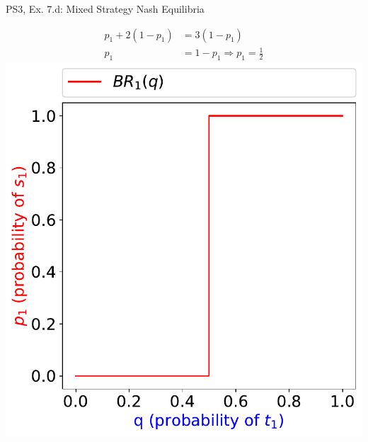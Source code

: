 \begin{frame}{PS3, Ex. 7.d: Mixed Strategy Nash Equilibria}
\begin{multicols}{2}
\begin{align*}
      p_1 + 2(1-p_1)  &= 3(1-p_1) \\
      p_1             &= 1-p_1 \Rightarrow p_1 = \frac{1}{2}
    \end{align*}
  \vfill\null \columnbreak
    \includegraphics[width=\columnwidth]{figures/5d1}
  \vfill\null
  \end{multicols}
\end{frame}
